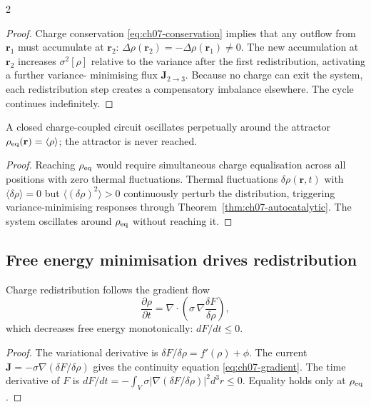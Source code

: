 \begin{multicols}{2}
\begin{proof}
Charge conservation \eqref{eq:ch07-conservation} implies that any outflow
from $\mathbf{r}_1$ must accumulate at $\mathbf{r}_2$:
$\Delta\rho(\mathbf{r}_2) = -\Delta\rho(\mathbf{r}_1) \neq 0$.  The new
accumulation at $\mathbf{r}_2$ increases $\sigma^2[\rho]$ relative to the
variance after the first redistribution, activating a further variance-
minimising flux $\mathbf{J}_{2\to 3}$.  Because no charge can exit the
system, each redistribution step creates a compensatory imbalance elsewhere.
The cycle continues indefinitely.
\end{proof}

\begin{corollary}
\label{cor:ch07-oscillation}
A closed charge-coupled circuit oscillates perpetually around the attractor
$\rho_{\mathrm{eq}}(\mathbf{r}) = \langle\rho\rangle$; the attractor is never reached.
\end{corollary}

\begin{proof}
Reaching $\rho_{\mathrm{eq}}$ would require simultaneous charge equalisation across all
positions with zero thermal fluctuations.  Thermal fluctuations
$\delta\rho(\mathbf{r},t)$ with $\langle\delta\rho\rangle = 0$ but
$\langle(\delta\rho)^2\rangle > 0$ continuously perturb the distribution,
triggering variance-minimising responses through
Theorem~\ref{thm:ch07-autocatalytic}.  The system oscillates around
$\rho_{\mathrm{eq}}$ without reaching it.
\end{proof}

\subsection{Free energy minimisation drives redistribution}

\begin{theorem}
\label{thm:ch07-gradient}
Charge redistribution follows the gradient flow
\begin{equation}
  \frac{\partial\rho}{\partial t}
  = \nabla\cdot\!\left(\sigma\,\nabla\frac{\delta F}{\delta\rho}\right),
  \label{eq:ch07-gradient}
\end{equation}
which decreases free energy monotonically: $dF/dt \le 0$.
\end{theorem}

\begin{proof}
The variational derivative is $\delta F/\delta\rho = f'(\rho) + \phi$.
The current $\mathbf{J} = -\sigma\nabla(\delta F/\delta\rho)$ gives the
continuity equation \eqref{eq:ch07-gradient}.  The time derivative of $F$
is $dF/dt = -\int_V \sigma|\nabla(\delta F/\delta\rho)|^2 d^3r \le 0$.
Equality holds only at $\rho_{\mathrm{eq}}$.
\end{proof}


\end{multicols}
